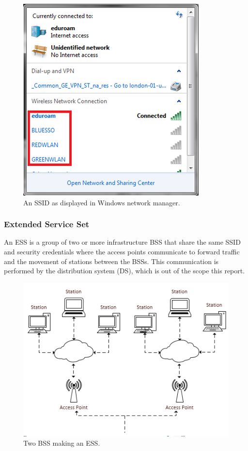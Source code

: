 \begin{figure}[htb!]
\centering\includegraphics{intro/diagrams/ssid.png}
\caption{An SSID as displayed in Windows network manager.}
\end{figure}

\subsubsection*{Extended Service Set}
An ESS is a group of two or more infrastructure BSS that share the same SSID and security credentials where the access points communicate to forward traffic and the movement of stations between the BSSs. This communication is performed by the distribution system (DS), which is out of the scope this report.

\begin{figure}[htb!]
\centering\includegraphics{intro/diagrams/ess.png}
\caption{Two BSS making an ESS.}
\end{figure}
\newpage


